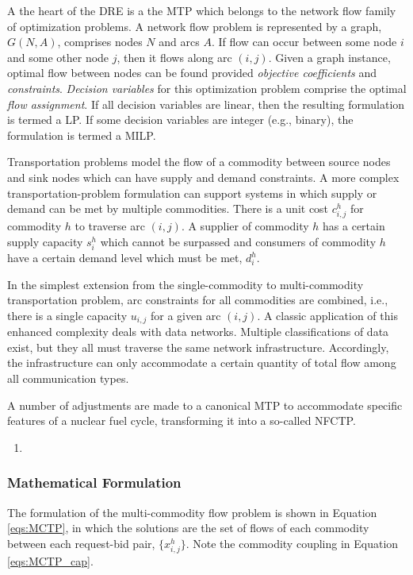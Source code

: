 A the heart of the \gls{DRE} is a the \gls{MTP} 
which belongs to the network flow family of optimization problems. A network
flow problem is represented by a graph, $G(N, A)$, comprises nodes $N$ and
arcs $A$. If flow can occur between some node $i$ and some other node $j$,
then it flows along arc $(i, j)$. Given a graph instance, optimal flow between
nodes can be found provided \textit{objective coefficients} and
\textit{constraints}. \textit{Decision variables} for this optimization
problem comprise the optimal \textit{flow assignment}. If all decision
variables are linear, then the resulting formulation is termed a \gls{LP}. If
some decision variables are integer (e.g., binary), the formulation is termed
a \gls{MILP}.

Transportation problems model the flow of a commodity between source nodes and
sink nodes which can have supply and demand constraints. A more complex
transportation-problem formulation can support systems in which supply or demand
can be met by multiple commodities.  There is a unit cost $c_{i,j}^{h}$ for
commodity $h$ to traverse arc $(i,j)$. A supplier of commodity $h$ has a certain
supply capacity $s_i^h$ which cannot be surpassed and consumers of commodity $h$
have a certain demand level which must be met, $d_i^h$.

In the simplest extension from the single-commodity to multi-commodity
transportation problem, arc constraints for all commodities are combined,
i.e., there is a single capacity $u_{i,j}$ for a given arc $(i, j)$. A classic
application of this enhanced complexity deals with data networks. Multiple
classifications of data exist, but they all must traverse the same network
infrastructure. Accordingly, the infrastructure can only accommodate a certain
quantity of total flow among all communication types.

A number of adjustments are made to a canonical MTP to accommodate specific
features of a nuclear fuel cycle, transforming it into a so-called
\gls{NFCTP}.

\begin{enumerate}
\item 
\end{enumerate}

\subsubsection{Mathematical Formulation}


The formulation of the multi-commodity flow problem is shown in Equation
\ref{eqs:MCTP}, in which the solutions are the set of flows of each commodity
between each request-bid pair, $\{x_{i,j}^h\}$. Note the commodity
coupling in Equation \ref{eqs:MCTP_cap}.

